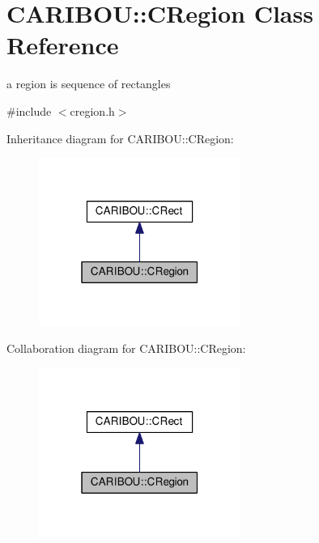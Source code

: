 \section{C\+A\+R\+I\+B\+OU\+:\+:C\+Region Class Reference}
\label{class_c_a_r_i_b_o_u_1_1_c_region}


a region is sequence of rectangles  




{\ttfamily \#include $<$cregion.\+h$>$}



Inheritance diagram for C\+A\+R\+I\+B\+OU\+:\+:C\+Region\+:\nopagebreak
\begin{figure}[H]
\begin{center}
\leavevmode
\includegraphics[width=187pt]{class_c_a_r_i_b_o_u_1_1_c_region__inherit__graph}
\end{center}
\end{figure}


Collaboration diagram for C\+A\+R\+I\+B\+OU\+:\+:C\+Region\+:\nopagebreak
\begin{figure}[H]
\begin{center}
\leavevmode
\includegraphics[width=187pt]{class_c_a_r_i_b_o_u_1_1_c_region__coll__graph}
\end{center}
\end{figure}

